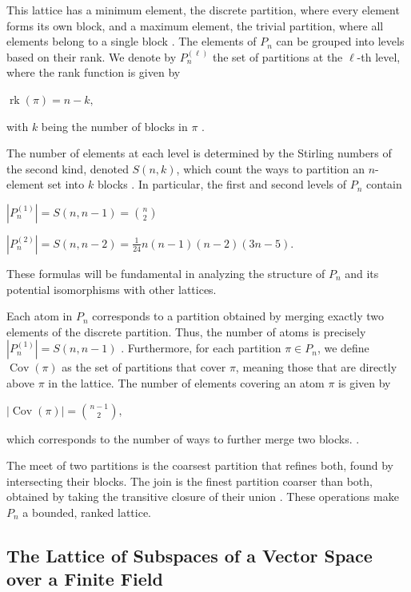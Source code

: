 \documentclass{article}
\begin{document}
This lattice has a minimum element, the discrete partition, where every element forms its own block, and a maximum element, the trivial partition, where all elements belong to a single block \citep{Birkhoff1940}. The elements of \( P_n \) can be grouped into levels based on their rank. We denote by \( P_n^{(\ell)} \) the set of partitions at the \( \ell \)-th level, where the rank function is given by  

$
\operatorname{rk}(\pi) = n - k,
$

with \( k \) being the number of blocks in \( \pi \) \citep{Stanley2012}.

The number of elements at each level is determined by the Stirling numbers of the second kind, denoted \( S(n, k) \), which count the ways to partition an \( n \)-element set into \( k \) blocks \citep{Comtet1974}. In particular, the first and second levels of \( P_n \) contain  

$
|P_n^{(1)}| = S(n, n-1) = \binom{n}{2}
$

$
|P_n^{(2)}| = S(n, n-2) = \frac{1}{24} n(n-1)(n-2)(3n-5).
$

These formulas will be fundamental in analyzing the structure of \( P_n \) and its potential isomorphisms with other lattices.

Each atom in \( P_n \) corresponds to a partition obtained by merging exactly two elements of the discrete partition. Thus, the number of atoms is precisely \( |P_n^{(1)}| = S(n, n-1) \) \citep{Stanley2012}. Furthermore, for each partition \( \pi \in P_n \), we define \( \operatorname{Cov}(\pi) \) as the set of partitions that cover \( \pi \), meaning those that are directly above \( \pi \) in the lattice. The number of elements covering an atom \( \pi \) is given by  

$
|\operatorname{Cov}(\pi)| = \binom{n-1}{2},
$

which corresponds to the number of ways to further merge two blocks. \citep{Comtet1974}.

The meet of two partitions is the coarsest partition that refines both, found by intersecting their blocks. The join is the finest partition coarser than both, obtained by taking the transitive closure of their union \citep{Gratzer2011}. These operations make \( P_n \) a bounded, ranked lattice.

\subsection{The Lattice of Subspaces of a Vector Space over a Finite Field}
\end{document}
